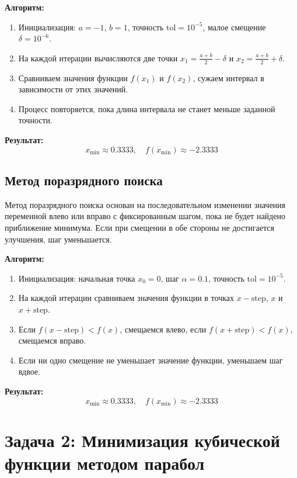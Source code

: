 \documentclass[a4paper,12pt]{article}
\begin{document}
\textbf{Алгоритм:}
\begin{enumerate}
    \item Инициализация: \( a = -1 \), \( b = 1 \), точность \( \text{tol} = 10^{-5} \), малое смещение \( \delta = 10^{-6} \).
    \item На каждой итерации вычисляются две точки \( x_1 = \frac{a + b}{2} - \delta \) и \( x_2 = \frac{a + b}{2} + \delta \).
    \item Сравниваем значения функции \( f(x_1) \) и \( f(x_2) \), сужаем интервал в зависимости от этих значений.
    \item Процесс повторяется, пока длина интервала не станет меньше заданной точности.
\end{enumerate}

\textbf{Результат:}
\[
x_{\text{min}} \approx 0.3333, \quad f(x_{\text{min}}) \approx -2.3333
\]

\subsection{Метод поразрядного поиска}

Метод поразрядного поиска основан на последовательном изменении значения переменной влево или вправо с фиксированным шагом, пока не будет найдено приближение минимума. Если при смещении в обе стороны не достигается улучшения, шаг уменьшается.

\textbf{Алгоритм:}
\begin{enumerate}
    \item Инициализация: начальная точка \( x_0 = 0 \), шаг \( \alpha = 0.1 \), точность \( \text{tol} = 10^{-5} \).
    \item На каждой итерации сравниваем значения функции в точках \( x - \text{step} \), \( x \) и \( x + \text{step} \).
    \item Если \( f(x - \text{step}) < f(x) \), смещаемся влево, если \( f(x + \text{step}) < f(x) \), смещаемся вправо.
    \item Если ни одно смещение не уменьшает значение функции, уменьшаем шаг вдвое.
\end{enumerate}

\textbf{Результат:}
\[
x_{\text{min}} \approx 0.3333, \quad f(x_{\text{min}}) \approx -2.3333
\]

\section{Задача 2: Минимизация кубической функции методом парабол}
\end{document}
